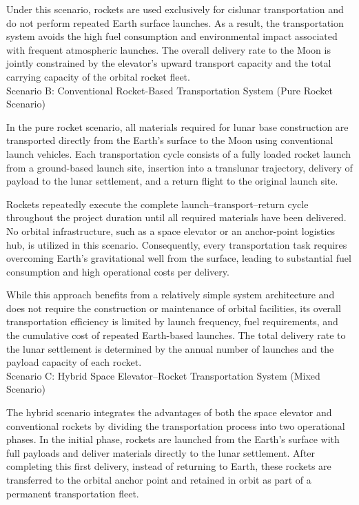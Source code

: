 ﻿\documentclass{mcmthesis}
\begin{document}
Under this scenario, rockets are used exclusively for cislunar transportation and do not perform repeated Earth surface launches. As a result, the transportation system avoids the high fuel consumption and environmental impact associated with frequent atmospheric launches. The overall delivery rate to the Moon is jointly constrained by the elevator’s upward transport capacity and the total carrying capacity of the orbital rocket fleet.\\
Scenario B: Conventional Rocket-Based Transportation System (Pure Rocket Scenario)

In the pure rocket scenario, all materials required for lunar base construction are transported directly from the Earth’s surface to the Moon using conventional launch vehicles. Each transportation cycle consists of a fully loaded rocket launch from a ground-based launch site, insertion into a translunar trajectory, delivery of payload to the lunar settlement, and a return flight to the original launch site.

Rockets repeatedly execute the complete launch–transport–return cycle throughout the project duration until all required materials have been delivered. No orbital infrastructure, such as a space elevator or an anchor-point logistics hub, is utilized in this scenario. Consequently, every transportation task requires overcoming Earth’s gravitational well from the surface, leading to substantial fuel consumption and high operational costs per delivery.

While this approach benefits from a relatively simple system architecture and does not require the construction or maintenance of orbital facilities, its overall transportation efficiency is limited by launch frequency, fuel requirements, and the cumulative cost of repeated Earth-based launches. The total delivery rate to the lunar settlement is determined by the annual number of launches and the payload capacity of each rocket.\\[1.2em]

Scenario C: Hybrid Space Elevator–Rocket Transportation System (Mixed Scenario)

The hybrid scenario integrates the advantages of both the space elevator and conventional rockets by dividing the transportation process into two operational phases. In the initial phase, rockets are launched from the Earth’s surface with full payloads and deliver materials directly to the lunar settlement. After completing this first delivery, instead of returning to Earth, these rockets are transferred to the orbital anchor point and retained in orbit as part of a permanent transportation fleet.
\end{document}
